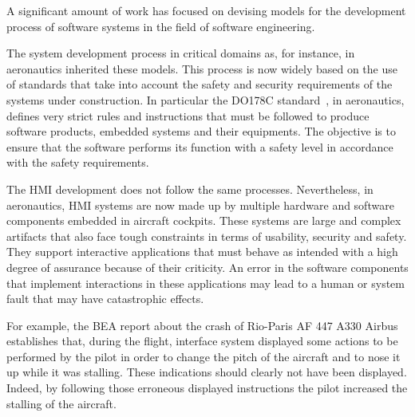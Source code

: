 
A significant  amount of work has  focused on devising models  for the
development  process of  software  systems in  the  field of  software
engineering.

The system development  process in critical domains  as, for instance,
in aeronautics  inherited these  models.  This  process is  now widely
based on  the use of standards  that take into account  the safety and
security  requirements   of  the   systems  under   construction.   In
particular the DO178C  standard~\cite{DO178C}, in aeronautics, defines
very strict  rules and instructions  that must be followed  to produce
software  products,  embedded  systems   and  their  equipments.   The
objective is to ensure that the  software performs its function with a
safety level in accordance with the safety requirements.

The HMI development does not  follow the same processes. Nevertheless,
in aeronautics, HMI  systems are now made up by  multiple hardware and
software components embedded in  aircraft cockpits.  These systems are
large and complex artifacts that  also face tough constraints in terms
of  usability,   security  and   safety.   They   support  interactive
applications  that must  behave  as  intended with  a  high degree  of
assurance  because  of their  criticity.   An  error in  the  software
components that implement interactions  in these applications may lead
to a human or system fault that may have catastrophic effects.  

For example, the BEA report \cite{BEA12} about the crash of Rio-Paris AF
447 A330 Airbus establishes that,  during the flight, interface system
displayed some actions to be performed by the pilot in order to change
the pitch  of the aircraft  and to nose it  up while it  was stalling.
These indications should clearly not  have been displayed.  Indeed, by
following those  erroneous displayed instructions the  pilot increased
the stalling of the aircraft.

